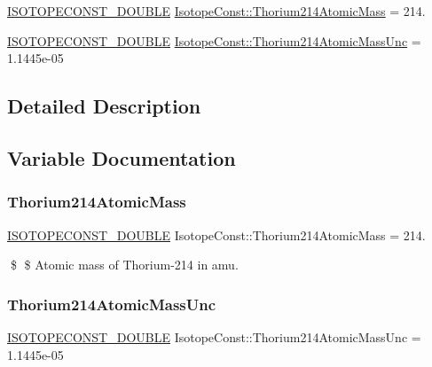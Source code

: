 \begin{DoxyCompactItemize}
\item 
\mbox{\hyperlink{group___isotope_const-_macros_ga8f45a7272ce02c0b4c65c44636ed719a}{I\+S\+O\+T\+O\+P\+E\+C\+O\+N\+S\+T\+\_\+\+D\+O\+U\+B\+LE}} \mbox{\hyperlink{group___isotope_const-_thorium-_th214_gaafec74fa3afe3083e9d74b94a7807588}{Isotope\+Const\+::\+Thorium214\+Atomic\+Mass}} = 214.
\item 
\mbox{\hyperlink{group___isotope_const-_macros_ga8f45a7272ce02c0b4c65c44636ed719a}{I\+S\+O\+T\+O\+P\+E\+C\+O\+N\+S\+T\+\_\+\+D\+O\+U\+B\+LE}} \mbox{\hyperlink{group___isotope_const-_thorium-_th214_ga2ceb9993be701b4d8fe1080ee17eff52}{Isotope\+Const\+::\+Thorium214\+Atomic\+Mass\+Unc}} = 1.\+1445e-\/05
\end{DoxyCompactItemize}


\subsection{Detailed Description}


\subsection{Variable Documentation}
\mbox{\label{group___isotope_const-_thorium-_th214_gaafec74fa3afe3083e9d74b94a7807588}} 
\subsubsection{\texorpdfstring{Thorium214\+Atomic\+Mass}{Thorium214AtomicMass}}
{\footnotesize\ttfamily \mbox{\hyperlink{group___isotope_const-_macros_ga8f45a7272ce02c0b4c65c44636ed719a}{I\+S\+O\+T\+O\+P\+E\+C\+O\+N\+S\+T\+\_\+\+D\+O\+U\+B\+LE}} Isotope\+Const\+::\+Thorium214\+Atomic\+Mass = 214.}

\$ \$ Atomic mass of Thorium-\/214 in amu. \mbox{\label{group___isotope_const-_thorium-_th214_ga2ceb9993be701b4d8fe1080ee17eff52}} 
\subsubsection{\texorpdfstring{Thorium214\+Atomic\+Mass\+Unc}{Thorium214AtomicMassUnc}}
{\footnotesize\ttfamily \mbox{\hyperlink{group___isotope_const-_macros_ga8f45a7272ce02c0b4c65c44636ed719a}{I\+S\+O\+T\+O\+P\+E\+C\+O\+N\+S\+T\+\_\+\+D\+O\+U\+B\+LE}} Isotope\+Const\+::\+Thorium214\+Atomic\+Mass\+Unc = 1.\+1445e-\/05}

